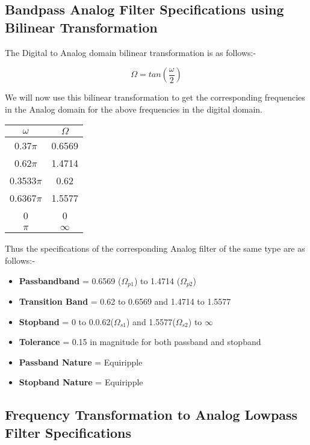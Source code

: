 \documentclass[12pt]{article}
\begin{document}
\subsection{Bandpass Analog Filter Specifications using Bilinear Transformation}
The Digital to Analog domain bilinear transformation is as follows:-

\[\Omega = tan(\frac{\omega}{2})\]

\noindent
We will now use this bilinear transformation to get the corresponding frequencies in the Analog domain for the above frequencies in the digital domain.

\begin{center}
    \begin{tabular}{|c|c|}
     \hline
    $\omega$ & $\Omega$ \\ \hline
    0.37$\pi$ & 0.6569 \\ \hline
    0.62$\pi$ & 1.4714 \\ \hline
    0.3533$\pi$ & 0.62 \\ \hline
    0.6367$\pi$ & 1.5577 \\ \hline
    0 & 0 \\ \hline
    $\pi$ & $\infty$ \\ \hline
    \end{tabular}
\end{center}
\newpage

\noindent

Thus the specifications of the corresponding Analog filter of the same type are as follows:-

\begin{itemize}
    \item \textbf{Passbandband} = 0.6569 ($\Omega_{p1}$) to 1.4714 ($\Omega_{p2}$)
    \item \textbf{Transition Band} = 0.62 to 0.6569 and 1.4714 to 1.5577
    \item \textbf{Stopband} = 0 to 0.0.62($\Omega_{s1}$) and 1.5577($\Omega_{s2}$) to $\infty$
    \item\textbf{Tolerance} = 0.15 in magnitude for both passband and stopband
    \item \textbf{Passband Nature} = Equiripple
    \item \textbf{Stopband Nature} = Equiripple
\end{itemize}

\subsection{Frequency Transformation to Analog Lowpass Filter Specifications}
\end{document}
